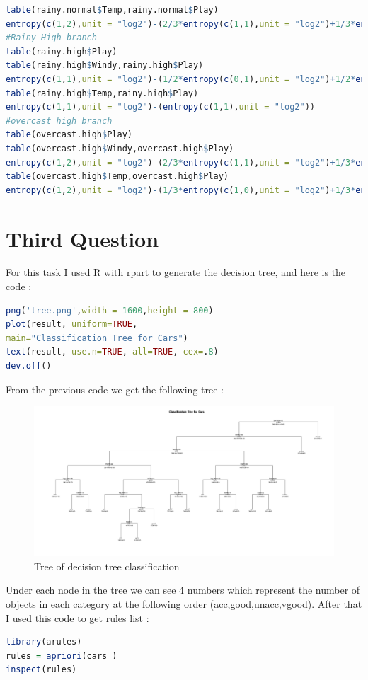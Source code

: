 \documentclass{article}
\begin{document}
\begin{lstlisting}[language=R]
table(rainy.normal$Temp,rainy.normal$Play)
entropy(c(1,2),unit = "log2")-(2/3*entropy(c(1,1),unit = "log2")+1/3*entropy(c(0,1),unit = "log2"))
#Rainy High branch
table(rainy.high$Play)
table(rainy.high$Windy,rainy.high$Play)
entropy(c(1,1),unit = "log2")-(1/2*entropy(c(0,1),unit = "log2")+1/2*entropy(c(1,0),unit = "log2"))
table(rainy.high$Temp,rainy.high$Play)
entropy(c(1,1),unit = "log2")-(entropy(c(1,1),unit = "log2"))
#overcast high branch
table(overcast.high$Play)
table(overcast.high$Windy,overcast.high$Play)
entropy(c(1,2),unit = "log2")-(2/3*entropy(c(1,1),unit = "log2")+1/3*entropy(c(0,1),unit = "log2"))
table(overcast.high$Temp,overcast.high$Play)
entropy(c(1,2),unit = "log2")-(1/3*entropy(c(1,0),unit = "log2")+1/3*entropy(c(0,1),unit = "log2")+1/3*entropy(c(0,1),unit = "log2"))
\end{lstlisting}
\section*{Third Question}
For this task I used R with rpart to generate the decision tree, and here is the code :
\begin{lstlisting}[language=R]
png('tree.png',width = 1600,height = 800)
plot(result, uniform=TRUE,
main="Classification Tree for Cars")
text(result, use.n=TRUE, all=TRUE, cex=.8)
dev.off()
\end{lstlisting}
From the previous code we get the following tree :
\begin{landscape}
\begin{figure}[H]
	\includegraphics[scale=0.47]{tree.png}
	\caption{Tree of decision tree classification}
\end{figure}
Under each node in the tree we can see 4 numbers which represent the number of objects in each category at the following order (acc,good,unacc,vgood).
After that I used this code to get rules list :
\begin{lstlisting}[language=R]
library(arules)
rules = apriori(cars )
inspect(rules)
\end{lstlisting}
\end{landscape}
\end{document}
